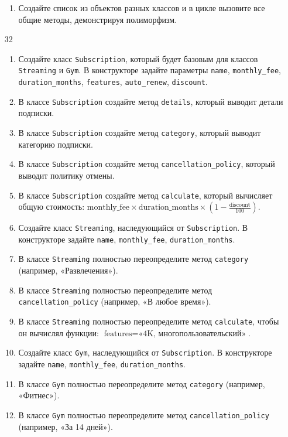 \begin{enumerate}
\begin{enumerate}
    \item Создайте список из объектов разных классов и в цикле вызовите все общие методы, демонстрируя полиморфизм.
\end{enumerate}
\item[32]
\begin{enumerate}
    \item Создайте класс \texttt{Subscription}, который будет базовым для классов \texttt{Streaming} и \texttt{Gym}. В конструкторе задайте параметры \texttt{name}, \texttt{monthly\_fee}, \texttt{duration\_months}, \texttt{features}, \texttt{auto\_renew}, \texttt{discount}.
    \item В классе \texttt{Subscription} создайте метод \texttt{details}, который выводит детали подписки.
    \item В классе \texttt{Subscription} создайте метод \texttt{category}, который выводит категорию подписки.
    \item В классе \texttt{Subscription} создайте метод \texttt{cancellation\_policy}, который выводит политику отмены.
    \item В классе \texttt{Subscription} создайте метод \texttt{calculate}, который вычисляет общую стоимость: \( \text{monthly\_fee} \times \text{duration\_months} \times (1 - \frac{\text{discount}}{100}) \).
    \item Создайте класс \texttt{Streaming}, наследующийся от \texttt{Subscription}. В конструкторе задайте \texttt{name}, \texttt{monthly\_fee}, \texttt{duration\_months}.
    \item В классе \texttt{Streaming} полностью переопределите метод \texttt{category} (например, «Развлечения»).
    \item В классе \texttt{Streaming} полностью переопределите метод \texttt{cancellation\_policy} (например, «В любое время»).
    \item В классе \texttt{Streaming} полностью переопределите метод \texttt{calculate}, чтобы он вычислял функции: \( \text{features} = \text{«4K, многопользовательский»} \).
    \item Создайте класс \texttt{Gym}, наследующийся от \texttt{Subscription}. В конструкторе задайте \texttt{name}, \texttt{monthly\_fee}, \texttt{duration\_months}.
    \item В классе \texttt{Gym} полностью переопределите метод \texttt{category} (например, «Фитнес»).
    \item В классе \texttt{Gym} полностью переопределите метод \texttt{cancellation\_policy} (например, «За 14 дней»).

\end{enumerate}
\end{enumerate}
